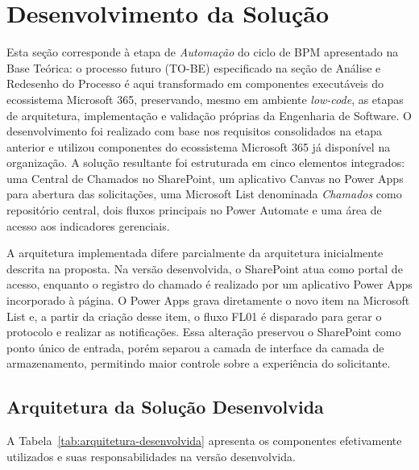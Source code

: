 \section{Desenvolvimento da Solução}

Esta seção corresponde à etapa de \textit{Automação} do
ciclo de BPM apresentado na Base Teórica: o processo futuro
(TO-BE) especificado na seção de Análise e Redesenho do
Processo é aqui transformado em componentes executáveis do
ecossistema Microsoft 365, preservando, mesmo em ambiente
\textit{low-code}, as etapas de arquitetura, implementação e
validação próprias da Engenharia de Software. O
desenvolvimento foi realizado com base nos requisitos
consolidados na etapa anterior e utilizou componentes do
ecossistema Microsoft 365 já disponível na organização. A
solução resultante foi estruturada em cinco elementos
integrados: uma Central de Chamados no SharePoint, um
aplicativo Canvas no Power Apps para abertura das
solicitações, uma Microsoft List denominada
\textit{Chamados} como repositório central, dois fluxos
principais no Power Automate e uma área de acesso aos
indicadores gerenciais.

A arquitetura implementada difere parcialmente da
arquitetura inicialmente descrita na proposta. Na versão
desenvolvida, o SharePoint atua como portal de acesso,
enquanto o registro do chamado é realizado por um
aplicativo Power Apps incorporado à página. O Power Apps
grava diretamente o novo item na Microsoft List e, a partir
da criação desse item, o fluxo FL01 é disparado para gerar o
protocolo e realizar as notificações. Essa alteração
preservou o SharePoint como ponto único de entrada, porém
separou a camada de interface da camada de armazenamento,
permitindo maior controle sobre a experiência do
solicitante.

\subsection{Arquitetura da Solução Desenvolvida}

A Tabela~\ref{tab:arquitetura-desenvolvida} apresenta os
componentes efetivamente utilizados e suas responsabilidades
na versão desenvolvida.


